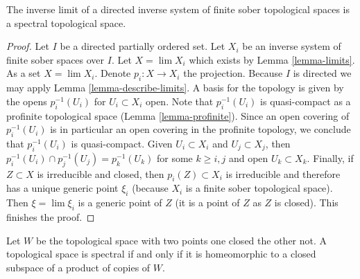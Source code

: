 \begin{lemma}
\label{lemma-directed-inverse-limit-finite-sober-spectral-spaces}
The inverse limit of a directed inverse system of finite sober
topological spaces is a spectral topological space.
\end{lemma}

\begin{proof}
Let $I$ be a directed partially ordered set. Let $X_i$ be an inverse
system of finite sober spaces over $I$. Let $X = \lim X_i$ which exists
by Lemma \ref{lemma-limits}. As a set $X = \lim X_i$. Denote
$p_i : X \to X_i$ the projection.
Because $I$ is directed we may apply Lemma \ref{lemma-describe-limits}.
A basis for the topology is given by the opens
$p_i^{-1}(U_i)$ for $U_i \subset X_i$ open. Note that $p_i^{-1}(U_i)$
is quasi-compact as a profinite topological space
(Lemma \ref{lemma-profinite}). Since an open covering of
$p_i^{-1}(U_i)$ is in particular an open covering in the profinite
topology, we conclude that $p_i^{-1}(U_i)$ is quasi-compact.
Given $U_i \subset X_i$ and $U_j \subset X_j$, then
$p_i^{-1}(U_i) \cap p_j^{-1}(U_j) = p_k^{-1}(U_k)$
for some $k \geq i, j$ and open $U_k \subset X_k$. Finally, if $Z \subset X$
is irreducible and closed, then $p_i(Z) \subset X_i$ is irreducible
and therefore has a unique generic point $\xi_i$ (because $X_i$
is a finite sober topological space). Then $\xi = \lim \xi_i$ is a
generic point of $Z$ (it is a point of $Z$ as $Z$ is closed).
This finishes the proof.
\end{proof}

\begin{lemma}
\label{lemma-spectral-closed-in-product-two-point-space}
Let $W$ be the topological space with two points one closed
the other not. A topological space is spectral if and only if
it is homeomorphic to a closed subspace of a product of
copies of $W$.
\end{lemma}

